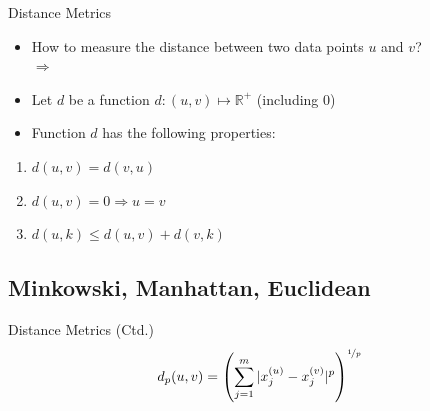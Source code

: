 \begin{frame}{Distance Metrics}{}
	\begin{itemize}
		\item How to measure the distance between two data points $u$ and $v$? \\
			$\Rightarrow$ 
		\item Let $d$ be a function $d : (u, v) \mapsto \mathbb{R}^{+}$ (including 0)
		\item Function $d$ has the following properties:
	\end{itemize}
	
	\vspace*{2mm}
	\begin{boxBlueNoFrame}
		\begin{enumerate}
			\item $d(u, v) = d(v, u)$ 
			\item $d(u, v) = 0 \Rightarrow u = v$
			\item $d(u, k) \le d(u, v) + d(v, k)$ 
		\end{enumerate}
	\end{boxBlueNoFrame}
\end{frame}


\subsection{Minkowski, Manhattan, Euclidean}

\begin{frame}{Distance Metrics (Ctd.)}{}
	\begin{equation}
		d_p(u, v) = \left( \sum_{j=1}^m \vert x_j^{(u)} - x_j^{(v)} \vert^p \right)^{\nicefrac{1}{p}}
	\end{equation}
	
\end{frame}


